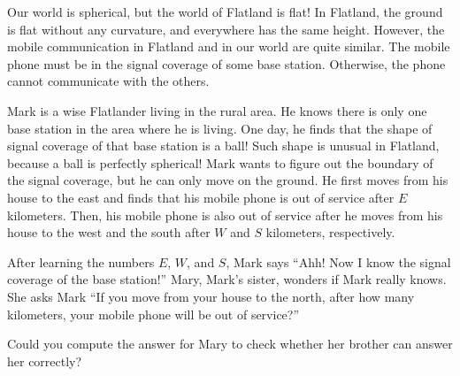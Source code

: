 Our world is spherical, but the world of Flatland is flat! 
In Flatland, the ground is flat without any curvature, 
and everywhere has the same height.
However, the mobile communication in Flatland and in our world are quite 
similar.
The mobile phone must be in the signal coverage of some base station.
Otherwise, the phone cannot communicate with the others.

Mark is a wise Flatlander living in the rural area.
He knows there is only one base station in the area where he is living.
One day, he finds that
the shape of signal coverage of that base station is a ball!
Such shape is unusual in Flatland, because a ball is perfectly spherical!
Mark wants to figure out the boundary of the signal coverage, 
but he can only move on the ground.
He first moves from his house to the east and finds that his mobile phone is out of service
after $E$ kilometers. 
Then, his mobile phone is also out of service after he moves from his house 
to the west and the south after $W$ and $S$ kilometers, respectively.

After learning the numbers $E$, $W$, and $S$, 
Mark says ``Ahh! Now I know the signal coverage of the base station!''
Mary, Mark's sister, wonders if Mark really knows. 
She asks Mark ``If you move from your house to the north, after how many 
kilometers, your mobile phone will be out of service?''

Could you compute the answer for Mary to check whether her brother can
answer her correctly? 
